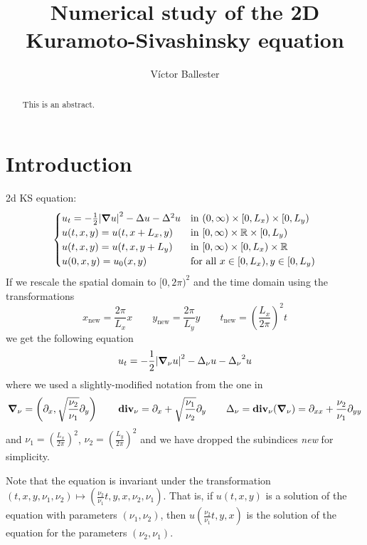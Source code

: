 \documentclass[twoside]{article}
\title{Numerical study of the 2D Kuramoto-Sivashinsky equation}
\author{Víctor Ballester}
\date{\parbox{\linewidth}{\centering
Instabilities and nonlinear phenomena\endgraf
M2 - Applied and Theoretical Mathematics\endgraf
Université Paris-Dauphine \& PSL\endgraf
\today}}
\begin{document}
\maketitle
\begin{abstract}
  This is an abstract.
\end{abstract}
{
\hypersetup{linkcolor=black}
\tableofcontents
}

\section{Introduction}
2d KS equation:
\begin{equation}
  \begin{cases}
    u_t = -\frac{1}{2}\abs{\grad u}^2 - \Delta u - \Delta^2 u & \text{in } (0, \infty) \times [0, L_x) \times [0, L_y) \\
    u(t, x, y) = u(t, x + L_x, y)                                     & \text{in } [0, \infty) \times \mathbb{R} \times [0, L_y)      \\
    u(t, x, y) = u(t, x, y + L_y)                                     & \text{in } [0, \infty) \times [0, L_x) \times \mathbb{R}      \\
    u(0, x, y) = u_0(x, y)                                            & \text{for all } x \in [0, L_x), y \in [0, L_y)
  \end{cases}
\end{equation}
If we rescale the spatial domain to $[0, 2\pi)^2$ and the time domain using the transformations
\begin{equation}
  x_\mathrm{new} = \frac{2\pi}{L_x} x \qquad y_\mathrm{new} = \frac{2\pi}{L_y} y \qquad t_\mathrm{new} = {\left(\frac{L_x}{2 \pi}\right)}^2 t
\end{equation}
we get the following equation
\begin{equation}
  u_t=-\frac{1}{2}\abs{\grad_\nu u}^2-\Delta_\nu u-{\Delta_\nu}^2 u
\end{equation}
where we used a slightly-modified notation from the one in \cite{Kalogirou2015}
\begin{equation}
  \grad_\nu = \left(\partial_x , \sqrt{\frac{\nu_2}{\nu_1}} \partial_y
  \right) \qquad \operatorname{\boldsymbol{\mathrm{div}}}_\nu = \partial_x + \sqrt{\frac{\nu_1}{\nu_2}} \partial_y
  \qquad \Delta_\nu = \operatorname{\boldsymbol{\mathrm{div}}}_\nu(\grad_\nu) = \partial_{xx} + \frac{\nu_2}{\nu_1} \partial_{yy}
\end{equation}
and $\displaystyle\nu_1 ={\left( \frac{L_x}{2\pi} \right)}^2$, $\displaystyle\nu_2 = {\left( \frac{L_y}{2\pi} \right)}^2$ and we have dropped the subindices \emph{new} for simplicity.

Note that the equation is invariant under the transformation $(t,x,y, \nu_1, \nu_2) \mapsto \left( \frac{\nu_2}{\nu_1} t, y, x, \nu_2, \nu_1 \right)$. That is, if $u(t,x,y)$ is a solution of the equation with parameters $(\nu_1, \nu_2)$, then $u\left( \frac{\nu_2}{\nu_1} t, y, x \right)$ is the solution of the equation for the parameters $(\nu_2, \nu_1)$.

{}
\printbibliography
\end{document}
